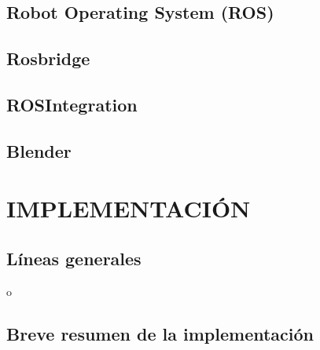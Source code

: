 \documentclass[a4paper, 12pt, spanish, twoside]{article}
\begin{document}
\subsection{Robot Operating System (ROS)} \label{sec:herramientas:ros}


\subsection{Rosbridge} 
\label{sec:herramientas:rosbridge}


\subsection{ROSIntegration} \label{sec:herramientas:rosintegration}


\subsection{Blender} \label{sec:herramientas:blender}


\clearpage





\newpage
\section{IMPLEMENTACIÓN} \label{sec:implementacion}

\subsection{Líneas generales} 

o

\subsection{Breve resumen de la implementación} 
\end{document}
